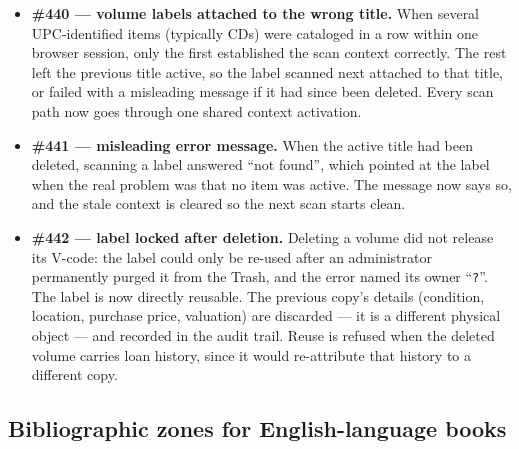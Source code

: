 \begin{itemize}
  \item \textbf{\#440 \string— volume labels attached to the wrong
        title.} When several UPC-identified items (typically CDs) were
        cataloged in a row within one browser session, only the first
        established the scan context correctly. The rest left the
        previous title active, so the label scanned next attached to
        that title, or failed with a misleading message if it had
        since been deleted. Every scan path now goes through one
        shared context activation.
  \item \textbf{\#441 \string— misleading error message.} When the
        active title had been deleted, scanning a label answered
        ``not found'', which pointed at the label when the real
        problem was that no item was active. The message now says so,
        and the stale context is cleared so the next scan starts
        clean.
  \item \textbf{\#442 \string— label locked after deletion.} Deleting
        a volume did not release its V-code: the label could only be
        re-used after an administrator permanently purged it from the
        Trash, and the error named its owner ``\texttt{?}''. The label
        is now directly reusable. The previous copy's details
        (condition, location, purchase price, valuation) are discarded
        — it is a different physical object — and recorded in the
        audit trail. Reuse is refused when the deleted volume carries
        loan history, since it would re-attribute that history to a
        different copy.
\end{itemize}

\subsection*{Bibliographic zones for English-language books}

